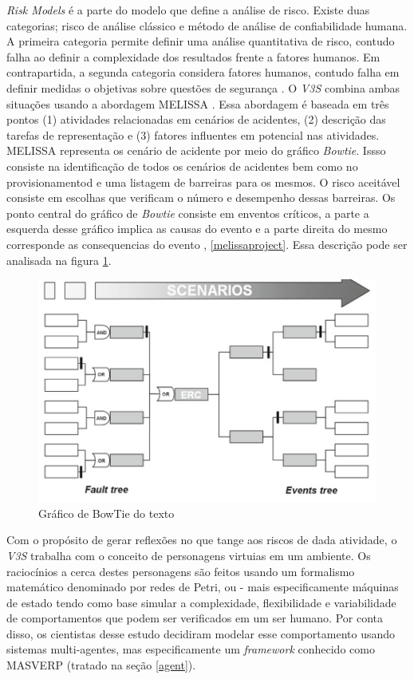 \textit{Risk Models} é a parte do modelo que define a análise de risco. Existe duas categorias; risco de análise clássico e método de análise de confiabilidade
humana. A primeira categoria permite definir uma análise quantitativa de risco, contudo falha ao definir a complexidade dos resultados frente a fatores humanos. 
Em contrapartida, a segunda categoria considera fatores humanos, contudo falha em definir medidas o objetivas sobre questões de segurança \cite{v3sframework}.
O \textit{V3S} combina ambas situações usando a abordagem MELISSA \cite{melissaproject} \cite{v3sframework}. Essa abordagem é baseada em três pontos (1) 
atividades relacionadas em cenários de acidentes, (2) descrição das tarefas de representação e (3) fatores influentes em potencial nas atividades. MELISSA representa os cenário de acidente por meio do gráfico \textit{Bowtie}. Issso consiste na identificação de todos os cenários de acidentes bem como no provisionamentod e uma listagem de barreiras para os mesmos. O risco aceitável 
consiste em escolhas que verificam o número e desempenho dessas barreiras. Os ponto central do gráfico de \textit{Bowtie} consiste em enventos críticos, a parte a esquerda desse gráfico 
implica as causas do evento e a parte direita do mesmo corresponde as consequencias do evento \cite{v3sframework}, \ref{melissaproject}. Essa descrição pode ser analisada na figura \ref{bowtiegraf}. 


\begin{figure}[H]
  \centering
  \includegraphics[width=0.5\linewidth]{figure/bowtie.png} 
  \caption{Gráfico de BowTie do texto \cite{melissaproject}}
  \label{bowtiegraf}
\end{figure}


Com o propósito de gerar reflexões no que tange aos riscos de dada atividade, o \textit{V3S} trabalha com o conceito de personagens virtuias em um ambiente. Os raciocínios a cerca destes personagens são feitos usando um 
formalismo matemático denominado por redes de Petri, ou - mais especificamente máquinas de estado \cite{v3sframework} tendo como base simular a complexidade, flexibilidade 
e variabilidade de comportamentos que podem ser verificados em um ser humano. Por conta disso, os cientistas desse estudo decidiram modelar esse comportamento usando 
sistemas multi-agentes, mas especificamente um \textit{framework} conhecido como MASVERP (tratado na seção \ref{agent}).

